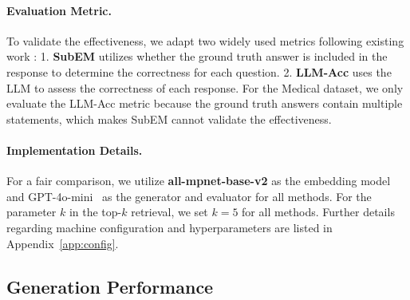 \paragraph{Evaluation Metric.}
To validate the effectiveness, we adapt two widely used metrics following existing work \cite{zhuang2025linearrag,wang2025archrag}: 1. \textbf{SubEM} utilizes whether the ground truth answer is included in the response to determine the correctness for each question. 2. \textbf{LLM-Acc} uses the LLM to assess the correctness of each response. For the Medical dataset, we only evaluate the LLM-Acc metric because the ground truth answers contain multiple statements, which makes SubEM cannot validate the effectiveness.

\paragraph{Implementation Details.}
For a fair comparison, we utilize \textbf{all-mpnet-base-v2} \cite{song2020mpnet} as the embedding model and GPT-4o-mini~\cite{openai2023gpt4} as the generator and evaluator for all methods. For the parameter $k$ in the top-$k$ retrieval, we set $k=5$ for all methods. Further details regarding machine configuration and hyperparameters are listed in Appendix~\ref{app:config}.


\subsection{Generation Performance}

